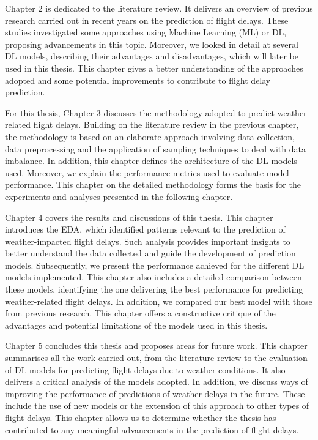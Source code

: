 \documentclass[12pt,oneside]{book} %
\begin{document}
\noindent Chapter 2 is dedicated to the literature review. It delivers an overview of previous research carried out in recent years on the prediction of flight delays. These studies investigated some approaches using Machine Learning (ML) or DL, proposing advancements in this topic. Moreover, we looked in detail at several DL models, describing their advantages and disadvantages, which will later be used in this thesis. This chapter gives a better understanding of the approaches adopted and some potential improvements to contribute to flight delay prediction.

\noindent For this thesis, Chapter 3 discusses the methodology adopted to predict weather-related flight delays. Building on the literature review in the previous chapter, the methodology is based on an elaborate approach involving data collection, data preprocessing and the application of sampling techniques to deal with data imbalance. In addition, this chapter defines the architecture of the DL models used. Moreover, we explain the performance metrics used to evaluate model performance. This chapter on the detailed methodology forms the basis for the experiments and analyses presented in the following chapter.

\noindent Chapter 4 covers the results and discussions of this thesis. This chapter introduces the EDA, which identified patterns relevant to the prediction of weather-impacted flight delays. Such analysis provides important insights to better understand the data collected and guide the development of prediction models. Subsequently, we present the performance achieved for the different DL models implemented. This chapter also includes a detailed comparison between these models, identifying the one delivering the best performance for predicting weather-related flight delays. In addition, we compared our best model with those from previous research. This chapter offers a constructive critique of the advantages and potential limitations of the models used in this thesis.

\noindent Chapter 5 concludes this thesis and proposes areas for future work. This chapter summarises all the work carried out, from the literature review to the evaluation of DL models for predicting flight delays due to weather conditions. It also delivers a critical analysis of the models adopted. In addition, we discuss ways of improving the performance of predictions of weather delays in the future. These include the use of new models or the extension of this approach to other types of flight delays. This chapter allows us to determine whether the thesis has contributed to any meaningful advancements in the prediction of flight delays.
\end{document}

